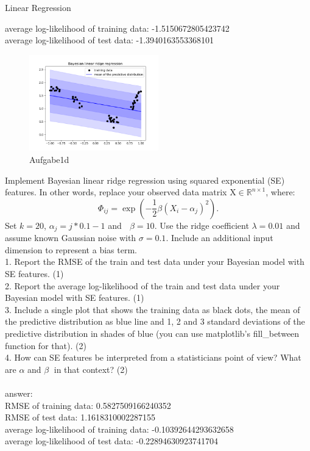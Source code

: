 \documentclass[
	ngerman,
     solution=true
	]{tudaexercise}
\begin{document}
\begin{task}{Linear Regression}
\begin{subtask}[1d)]
average log-likelihood of training data: -1.5150672805423742\\
average log-likelihood of test data: -1.3940163553368101\\
\begin{figure}[H] 
\centering 
\includegraphics[width=0.5\textwidth]{Aufgabe_1d.png} 
\caption{Aufgabe1d } 
\label{Fig.main3}
\end{figure}
\end{subtask}
\begin{subtask}[1e)]
Implement Bayesian linear ridge regression using squared exponential (SE) features. In other words, replace your
observed data matrix $\mathrm{X} \in \mathbb{R}^{n \times 1}$, where:
\[
\Phi_{i j}=\exp \left(-\frac{1}{2} \beta\left(X_{i}-\alpha_{j}\right)^{2}\right) .
\]
Set $k = 20$, $\alpha_j = j \ast 0.1-1$ and  $\beta= 10$. Use the ridge coefficient $\lambda = 0.01$ and assume known Gaussian noise with
$\sigma = 0.1$. Include an additional input dimension to represent a bias term.\\
1. Report the RMSE of the train and test data under your Bayesian model with SE features. (1)\\[15pt]
2. Report the average log-likelihood of the train and test data under your Bayesian model with SE features. (1)\\[15pt]
3. Include a single plot that shows the training data as black dots, the mean of the predictive distribution as blue
line and 1, 2 and 3 standard deviations of the predictive distribution in shades of blue (you can use matplotlib’s
fill\_between function for that). (2)\\[15pt]
4. How can SE features be interpreted from a statisticians point of view? What are $\alpha$ and $\beta$ in that context? (2)\\[15pt]
\\[15pt]
answer:\\[15pt]
RMSE of training data: 0.5827509166240352\\
RMSE of test data: 1.1618310002287155\\
average log-likelihood of training data: -0.10392644293632658\\
average log-likelihood of test data: -0.22894630923741704\\


\end{subtask}
\end{task}
\end{document}
